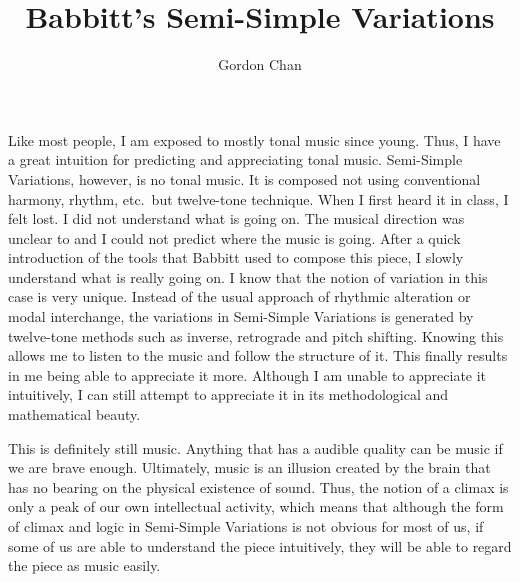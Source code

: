\documentclass[a4paper]{article}
\title{Babbitt's Semi-Simple Variations}
\author{Gordon Chan}
\begin{document}
\maketitle

Like most people, I am exposed to mostly tonal music since young.
Thus, I have a great intuition for predicting and appreciating tonal music.
Semi-Simple Variations, however, is no tonal music. 
It is composed not using conventional harmony, rhythm, etc.\
but twelve-tone technique. When I first heard it in class, 
I felt lost. I did not understand what is going on. 
The musical direction was unclear to and I could not predict where the music is going.
After a quick introduction of the tools that Babbitt used to compose this piece,
I slowly understand what is really going on.
I know that the notion of variation in this case is very unique.
Instead of the usual approach of rhythmic alteration or modal interchange,
the variations in Semi-Simple Variations is generated by twelve-tone methods
such as inverse, retrograde and pitch shifting.
Knowing this allows me to listen to the music and follow the structure of it.
This finally results in me being able to appreciate it more.
Although I am unable to appreciate it intuitively, I can still attempt to 
appreciate it in its methodological and mathematical beauty.\

This is definitely still music. Anything that has a audible quality can be music if we are brave enough.
Ultimately, music is an illusion created by the brain that has no bearing
on the physical existence of sound. Thus, the notion of a climax is only
a peak of our own intellectual activity, which means that although the
form of climax and logic in Semi-Simple Variations is not obvious for most of us,
if some of us are able to understand the piece intuitively, they will be able to 
regard the piece as music easily.
\end{document}
